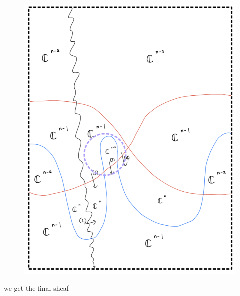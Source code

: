 \begin{enumerate}[label=(Step \arabic*)]
\begin{figure}[H]
    \centering
    \includegraphics[scale = 0.95]{diagrams/cobord'8/8.png}
    \caption{}
    \label{fig:your-label}
\end{figure}

we get the final sheaf


\end{enumerate}
